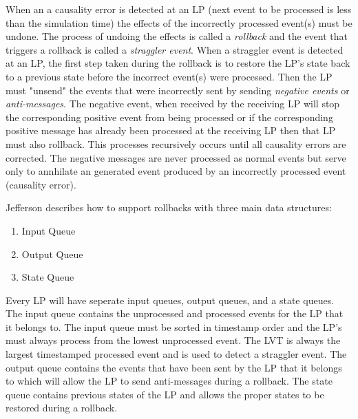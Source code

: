 \documentclass[11pt]{book}
\begin{document}
When an a causality error is detected at an LP (next event to be processed is less than the
simulation time) the effects of the incorrectly processed event(s) must be undone. The process of
undoing the effects is called a \emph{rollback} and the event that triggers a rollback is called
a \emph{straggler event}. When a straggler event is detected at an LP, the first step taken during
the rollback is to restore the LP's state back to a previous state before the incorrect event(s)
were processed. Then the LP must "unsend" the events that were incorrectly sent by sending
\emph{negative events} or \emph{anti-messages}. The negative event, when received by the receiving
LP will stop the corresponding positive event from being processed or if the corresponding positive
message has already been processed at the receiving LP then that LP must also rollback. This processes
recursively occurs until all causality errors are corrected. The negative messages are never processed
as normal events but serve only to annhilate an generated event produced by an incorrectly processed
event (causality error).

Jefferson\cite{jefferson-85} describes how to support rollbacks with three main data structures:

\begin{enumerate}

    \item Input Queue
    \item Output Queue
    \item State Queue

\end{enumerate}

\noindent
Every LP will have seperate input queues, output queues, and a state queues. The input queue contains the
unprocessed and processed events for the LP that it belongs to. The input queue must be sorted in
timestamp order and the LP's must always process from the lowest unprocessed event. The LVT is
always the largest timestamped processed event and is used to detect a straggler event. The output
queue contains the events that have been sent by the LP that it belongs to which will allow the LP
to send anti-messages during a rollback. The state queue contains previous states of the LP
and allows the proper states to be restored during a rollback.
\end{document}
